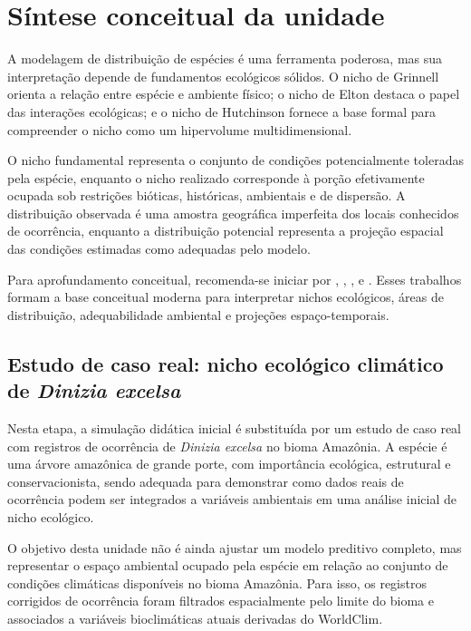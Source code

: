 \section{Síntese conceitual da unidade}

A modelagem de distribuição de espécies é uma ferramenta poderosa, mas sua interpretação depende de fundamentos ecológicos sólidos. O nicho de Grinnell orienta a relação entre espécie e ambiente físico; o nicho de Elton destaca o papel das interações ecológicas; e o nicho de Hutchinson fornece a base formal para compreender o nicho como um hipervolume multidimensional.

O nicho fundamental representa o conjunto de condições potencialmente toleradas pela espécie, enquanto o nicho realizado corresponde à porção efetivamente ocupada sob restrições bióticas, históricas, ambientais e de dispersão. A distribuição observada é uma amostra geográfica imperfeita dos locais conhecidos de ocorrência, enquanto a distribuição potencial representa a projeção espacial das condições estimadas como adequadas pelo modelo.

\begin{leitura}
Para aprofundamento conceitual, recomenda-se iniciar por \textcite{guisan2005predicting}, \textcite{soberon2007}, \textcite{soberon2009}, \textcite{peterson2011} e \textcite{guisan2017habitat}. Esses trabalhos formam a base conceitual moderna para interpretar nichos ecológicos, áreas de distribuição, adequabilidade ambiental e projeções espaço-temporais.
\end{leitura}

\subsection{Estudo de caso real: nicho ecológico climático de \textit{Dinizia excelsa}}

Nesta etapa, a simulação didática inicial é substituída por um estudo de caso real com registros de ocorrência de \textit{Dinizia excelsa} no bioma Amazônia. A espécie é uma árvore amazônica de grande porte, com importância ecológica, estrutural e conservacionista, sendo adequada para demonstrar como dados reais de ocorrência podem ser integrados a variáveis ambientais em uma análise inicial de nicho ecológico.

O objetivo desta unidade não é ainda ajustar um modelo preditivo completo, mas representar o espaço ambiental ocupado pela espécie em relação ao conjunto de condições climáticas disponíveis no bioma Amazônia. Para isso, os registros corrigidos de ocorrência foram filtrados espacialmente pelo limite do bioma e associados a variáveis bioclimáticas atuais derivadas do WorldClim.

